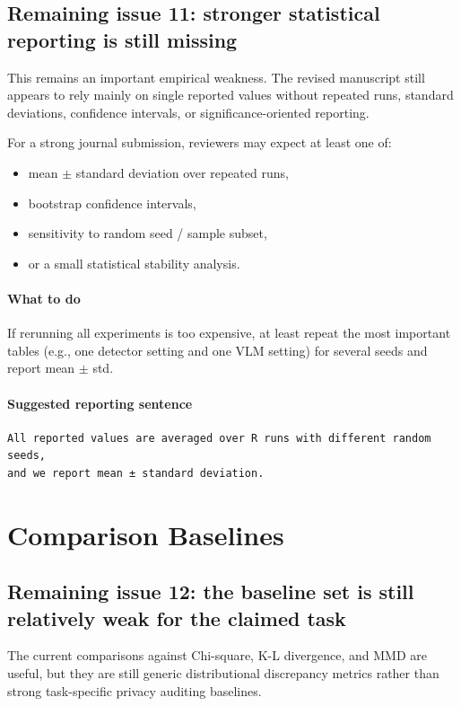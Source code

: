 \documentclass[11pt]{article}
\begin{document}
\subsection*{Remaining issue 11: stronger statistical reporting is still missing}
This remains an important empirical weakness. The revised manuscript still appears to rely mainly on single reported values without repeated runs, standard deviations, confidence intervals, or significance-oriented reporting.

For a strong journal submission, reviewers may expect at least one of:
\begin{itemize}
    \item mean \(\pm\) standard deviation over repeated runs,
    \item bootstrap confidence intervals,
    \item sensitivity to random seed / sample subset,
    \item or a small statistical stability analysis.
\end{itemize}

\paragraph{What to do}
If rerunning all experiments is too expensive, at least repeat the most important tables (e.g., one detector setting and one VLM setting) for several seeds and report mean \(\pm\) std.

\paragraph{Suggested reporting sentence}
\begin{verbatim}
All reported values are averaged over R runs with different random seeds,
and we report mean ± standard deviation.
\end{verbatim}

\section{Comparison Baselines}

\subsection*{Remaining issue 12: the baseline set is still relatively weak for the claimed task}
The current comparisons against Chi-square, K-L divergence, and MMD are useful, but they are still generic distributional discrepancy metrics rather than strong task-specific privacy auditing baselines.
\end{document}
